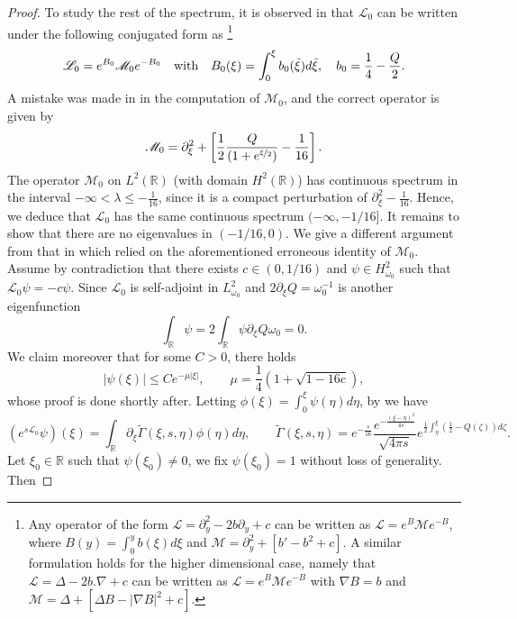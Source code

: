 \documentclass[11pt]{aims}
\theoremstyle{definition}
\newcommand{\Lc}{\mathcal{L}}
\newcommand{\Ls}{\mathscr{L}}
\newcommand{\Ms}{\mathscr{M}}
\newcommand{\pa}{\partial}
\newcommand{\be}{\begin{equation}}
\newcommand{\ee}{\end{equation}}
\numberwithin{equation}{section}
\begin{document}
\begin{proof}
To study the rest of the spectrum, it is observed in \cite{Sam76} that $\Ls_0$ can be written under the following conjugated form as \footnote{Any operator of the form $\Lc = \partial_y^2 - 2b \partial_y + c$ can be written as $\Lc = e^B \mathcal{M} e^{-B}$, where $B(y) = \int_0^y b(\xi) d\xi$ and $\mathcal{M} = \partial_y^2 + [b' - b^2 + c]$. A similar formulation holds for the  higher dimensional case, namely that $\Lc = \Delta - 2b.\nabla +c$ can be written as $\Lc = e^{B} \mathcal{M} e^{-B}$ with $\nabla B = b$ and $\mathcal{M} = \Delta + [\Delta B - |\nabla B|^2 + c]$.}
\begin{equation}
\Ls_0 = e^{B_0} \Ms_0 e^{-B_0} \quad \textup{with} \quad B_0(\xi) = \int_0^\xi b_0(\tilde \xi) d\tilde \xi, \quad  b_0 = \frac{1}{4} - \frac{Q}{2}.
\end{equation}
A mistake was made in \cite{Sam76} in the computation of $\Ms_0$, and the correct operator is given by
\begin{equation}
\Ms_0 = \partial^2_\xi  +\left[ \frac{1}{2} \frac{Q}{(1 + e^{\nicefrac{\xi}{2}})}- \frac{1}{16} \right].
\end{equation}
The operator $\Ms_0$ on $L^2(\mathbb R)$ (with domain $H^2(\mathbb R)$) has continuous spectrum in the interval $-\infty < \lambda \leq -\frac{1}{16}$, since it is a compact perturbation of $\pa_{\xi}^2-\frac{1}{16}$. Hence, we deduce that $\Ls_0$ has the same continuous spectrum $(-\infty,-1/16]$. It remains to show that there are no eigenvalues in $(-1/16,0)$. We give a different argument from that in \cite{Sam76} which relied on the aforementioned erroneous identity of $ \Ms_0$. Assume by contradiction that there exists $c\in (0,1/16)$ and $\psi \in H^2_{\omega_0}$ such that $\Ls_0 \psi=-c\psi$. Since $\Ls_0$ is self-adjoint in $L^2_{\omega_0}$ and $2\pa_\xi Q=\omega_0^{-1}$ is another eigenfunction
\be \label{spectral:zeromean}
\int_{\mathbb R} \psi=2\int_{\mathbb R} \psi \pa_\xi Q \omega_0 =0.
\ee
We claim moreover that for some $C>0$, there holds
\be \label{spectral:claim}
|\psi(\xi)|\leq Ce^{-\mu |\xi|}, \qquad \mu=\frac 14 (1+\sqrt{1-16 c}),
\ee
whose proof is done shortly after. Letting $ \phi(\xi)=\int_{0}^\xi \psi(\eta)d\eta$, by \cite[Theorem 2]{Njjam85} we have
$$
(e^{s \Ls_0} \psi)(\xi)=\int_{\mathbb R} \pa_\xi \tilde \Gamma(\xi,s,\eta) \phi(\eta)d\eta, \qquad \tilde \Gamma (\xi,s,\eta)= e^{-\frac{s}{16}} \frac{e^{-\frac{(\xi-\eta)^2}{4s}}}{\sqrt{4\pi s}}e^{\frac{1}{2}\int_{\eta}^\xi (\frac 12 -Q(\zeta))d\zeta}.
$$
Let $\xi_0\in \mathbb R$ such that $\psi(\xi_0)\neq 0$, we fix $\psi(\xi_0)=1$ without loss of generality. Then

\end{proof}
\end{document}
